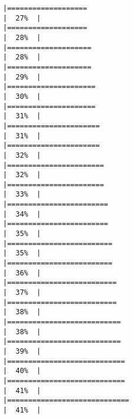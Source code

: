\documentclass[
]{article}
\begin{document}
\begin{verbatim}
|===================                                                   |  27%  |                                                                              |===================                                                   |  28%  |                                                                              |====================                                                  |  28%  |                                                                              |====================                                                  |  29%  |                                                                              |=====================                                                 |  30%  |                                                                              |=====================                                                 |  31%  |                                                                              |======================                                                |  31%  |                                                                              |======================                                                |  32%  |                                                                              |=======================                                               |  32%  |                                                                              |=======================                                               |  33%  |                                                                              |========================                                              |  34%  |                                                                              |========================                                              |  35%  |                                                                              |=========================                                             |  35%  |                                                                              |=========================                                             |  36%  |                                                                              |==========================                                            |  37%  |                                                                              |==========================                                            |  38%  |                                                                              |===========================                                           |  38%  |                                                                              |===========================                                           |  39%  |                                                                              |============================                                          |  40%  |                                                                              |============================                                          |  41%  |                                                                              |=============================                                         |  41%  |                                                                              
\end{verbatim}
\end{document}
